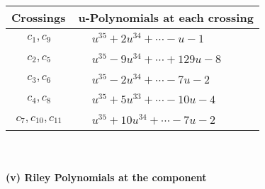 \documentclass[1p]{elsarticle_modified}
\theoremstyle{definition}
\begin{document}
\begin{tabular}{m{50pt}|m{274pt}}
Crossings & \hspace{64pt}u-Polynomials at each crossing \\
\hline $$\begin{aligned}c_{1},c_{9}\end{aligned}$$&$\begin{aligned}
&u^{35}+2 u^{34}+\cdots- u-1
\end{aligned}$\\
\hline $$\begin{aligned}c_{2},c_{5}\end{aligned}$$&$\begin{aligned}
&u^{35}-9 u^{34}+\cdots+129 u-8
\end{aligned}$\\
\hline $$\begin{aligned}c_{3},c_{6}\end{aligned}$$&$\begin{aligned}
&u^{35}-2 u^{34}+\cdots-7 u-2
\end{aligned}$\\
\hline $$\begin{aligned}c_{4},c_{8}\end{aligned}$$&$\begin{aligned}
&u^{35}+5 u^{33}+\cdots-10 u-4
\end{aligned}$\\
\hline $$\begin{aligned}c_{7},c_{10},c_{11}\end{aligned}$$&$\begin{aligned}
&u^{35}+10 u^{34}+\cdots-7 u-2
\end{aligned}$\\
\hline
\end{tabular}\\~\\
\newpage\renewcommand{\arraystretch}{1}
\flushleft \textbf{(v) Riley Polynomials at the component}\newline \\
\end{document}
